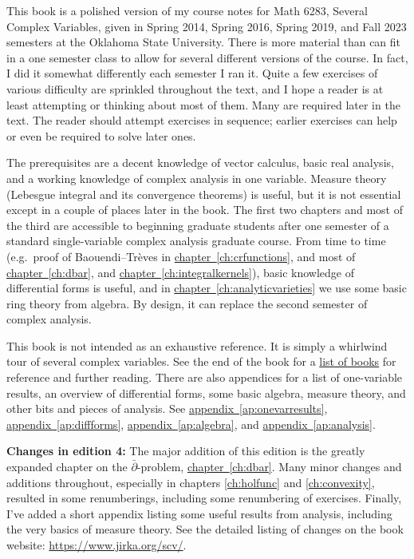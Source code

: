 \documentclass[12pt,openany]{book}
\theoremstyle{plain}
\theoremstyle{remark}
\theoremstyle{definition}
\theoremstyle{exercise}
\theoremstyle{example}
\newcommand{\chapterref}[1]{\hyperref[#1]{chapter~\ref*{#1}}}
\newcommand{\appendixref}[1]{\hyperref[#1]{appendix~\ref*{#1}}}
\begin{document}

This book is a polished version of my course notes for Math 6283, Several
Complex Variables, given in
Spring 2014, Spring 2016, Spring 2019, and Fall 2023 semesters
at the Oklahoma State University.
There is more material than can fit in a one semester class
to allow for several different versions of the course.
In fact, I did it somewhat differently each semester I ran it.
Quite a few exercises of various difficulty are
sprinkled throughout the text, and I hope a reader is
at least attempting or thinking about most of them.
Many are required later in the text.
The reader should attempt exercises in sequence; earlier exercises
can help or even be required to solve later ones.

The prerequisites are a decent knowledge of vector calculus, basic
real analysis, and a working knowledge of complex analysis in one variable.
Measure theory (Lebesgue integral and its convergence theorems) is useful,
but it is not essential except in a couple of places later in the book.
The first two chapters and most of the third
are accessible to beginning graduate students after one semester
of a standard single-variable complex
analysis graduate course.
From time to time (e.g.\ proof of Baouendi--Tr\`eves in
\chapterref{ch:crfunctions},
and most of
\chapterref{ch:dbar}, and \chapterref{ch:integralkernels}),
basic knowledge of differential forms is useful, and
in \chapterref{ch:analyticvarieties}
we use some basic ring theory from algebra.
By design, it can replace the second semester of complex analysis.

This book is not intended as an exhaustive reference.
It is simply a whirlwind tour of several complex variables.
See the end of the book
for a \hyperref[ch:furtherreading]{list of books} for
reference and further reading.  There are also appendices for
a list of one-variable results, an overview of differential forms,
some basic algebra, measure theory, and other bits and pieces of analysis.
See \appendixref{ap:onevarresults},
\appendixref{ap:diffforms},
\appendixref{ap:algebra}, and
\appendixref{ap:analysis}.

\textbf{Changes in edition 4:}
The major addition of this edition is the greatly
expanded chapter on the
$\bar{\partial}$-problem, \chapterref{ch:dbar}.
Many minor changes and additions throughout, especially in chapters
\ref{ch:holfunc} and \ref{ch:convexity},
resulted in some renumberings, including some renumbering of exercises.
Finally, I've added a short
appendix listing some useful results from analysis, including the very
basics of measure theory.
See the detailed listing of changes on the book website:
\url{https://www.jirka.org/scv/}.
\end{document}
